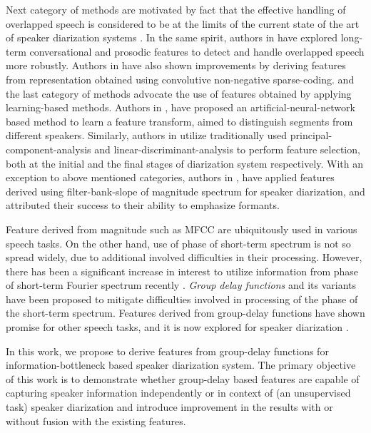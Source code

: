 \documentclass[conference]{IEEEtran}
\begin{document}
Next category of methods are motivated by fact that the effective handling of
overlapped speech is considered to be at the limits of the current state of the
art of speaker diarization systems \cite{reviewPaper1,featOverLap}. In the same
spirit, authors in \cite{featProsody,featOverLap} have explored long-term
conversational and prosodic features to detect and handle overlapped speech more
robustly. Authors in \cite{featSC} have also shown improvements by deriving
features from representation obtained using convolutive non-negative
sparse-coding. and the last category of methods advocate the use of features
obtained by applying learning-based methods. Authors in \cite{featANN}, have
proposed an artificial-neural-network based method to learn a feature transform,
aimed to distinguish segments from different speakers. Similarly, authors in
\cite{featPCAnLDA} utilize traditionally used principal-component-analysis and
linear-discriminant-analysis to perform feature selection, both at the initial
and the final stages of diarization system respectively. With an exception to
above mentioned categories, authors in \cite{featFilterBank}, have applied
features derived using filter-bank-slope of magnitude spectrum for speaker
diarization, and attributed their success to their ability to emphasize
formants. 

Feature derived from magnitude such as MFCC are ubiquitously used in various
speech tasks. On the other hand, use of phase of short-term spectrum is not so
spread widely, due to additional involved difficulties in their processing.
However, there has been a significant increase in interest to utilize
information from phase of short-term Fourier spectrum recently
\cite{phaseImportantInterspeech14,gdSurvey}. {\textit{Group delay functions}}
and its variants have been proposed to mitigate difficulties involved in
processing of the phase of the short-term spectrum. Features derived from
group-delay functions have shown promise for other speech tasks, and it is now
explored for speaker diarization \cite{modifiedGD,allPoleGdSid}. 

In this work, we propose to derive features from group-delay functions for
information-bottleneck based speaker diarization system. The primary objective
of this work is to demonstrate whether group-delay based features are capable of
capturing speaker information independently or in context of (an unsupervised
task) speaker diarization and introduce improvement in the results with or
without fusion with the existing features. 
\end{document}
